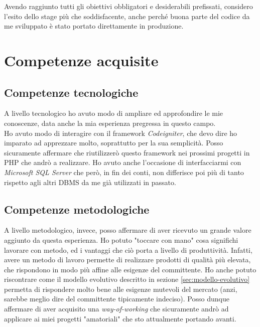 Avendo raggiunto tutti gli obiettivi obbligatori e desiderabili prefissati, considero l'esito dello stage più che soddisfacente, anche perché buona parte del codice da me sviluppato è stato portato direttamente in produzione.
\section{Competenze acquisite}
\subsection{Competenze tecnologiche}
A livello tecnologico ho avuto modo di ampliare ed approfondire le mie conoscenze, data anche la mia esperienza pregressa in questo campo.\\ Ho avuto modo di interagire con il \gls{framework} \textit{Codeigniter}, che devo dire ho imparato ad apprezzare molto, soprattutto per la sua semplicità. Posso sicuramente affermare che riutilizzerò questo \gls{framework} nei prossimi progetti in PHP che andrò a realizzare. Ho avuto anche l'occasione di interfacciarmi con \textit{Microsoft SQL Server} che però, in fin dei conti, non differisce poi più di tanto rispetto agli altri \gls{DBMS} da me già utilizzati in passato.
\subsection{Competenze metodologiche}
A livello metodologico, invece, posso affermare di aver ricevuto un grande valore aggiunto da questa esperienza. Ho potuto "toccare con mano" cosa significhi lavorare con metodo, ed i vantaggi che ciò porta a livello di produttività. Infatti, avere un metodo di lavoro permette di realizzare prodotti di qualità più elevata, che rispondono in modo più affine alle esigenze del committente. Ho anche potuto riscontrare come il modello evolutivo descritto in sezione \ref{sec:modello-evolutivo} permetta di rispondere molto bene alle esigenze mutevoli del mercato (anzi, sarebbe meglio dire del committente tipicamente indeciso). Posso dunque affermare di aver acquisito una \textit{way-of-working} che sicuramente andrò ad applicare ai miei progetti "amatoriali" che sto attualmente portando avanti.
